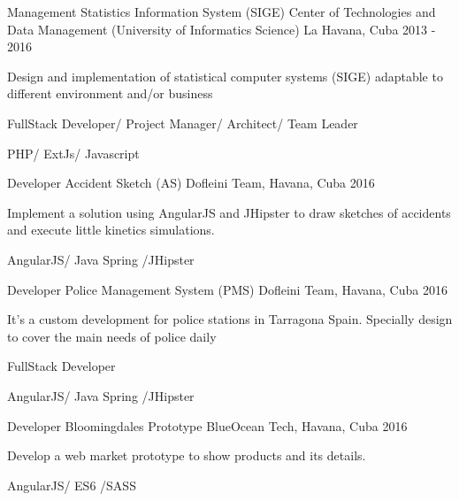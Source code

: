 \begin{cventries}

\cventry
{Management Statistics Information System (SIGE)} %
{Center of Technologies and Data Management (University of Informatics Science)} %
{La Havana, Cuba} %
{2013 - 2016} %
{ %
\begin{cvitems}
\item {Design and implementation of statistical computer systems (SIGE) adaptable to different environment and/or business}
\item {FullStack Developer/ Project Manager/ Architect/ Team Leader}
\item {PHP/ ExtJs/ Javascript}
\end{cvitems}
}


\cventry
{Developer} %
{Accident Sketch (AS)} %
{Dofleini Team, Havana, Cuba} %
{2016} %
{ %
\begin{cvitems}
\item {Implement a solution using AngularJS and JHipster to draw sketches of accidents and execute little kinetics simulations.}
\item {AngularJS/ Java Spring /JHipster}
\end{cvitems}
}


\cventry
{Developer} %
{Police Management System (PMS)} %
{Dofleini Team, Havana, Cuba} %
{2016} %
{ %
\begin{cvitems}
\item {It’s a custom development for police stations in Tarragona Spain. Specially design to cover the main needs of police daily}
\item {FullStack Developer}
\item {AngularJS/ Java Spring /JHipster}
\end{cvitems}
}


\cventry
{Developer} %
{Bloomingdales Prototype} %
{BlueOcean Tech, Havana, Cuba} %
{2016} %
{ %
\begin{cvitems}
\item {Develop a web market prototype to show products and its details.}
\item {AngularJS/ ES6 /SASS}
\end{cvitems}
}


\end{cventries}
